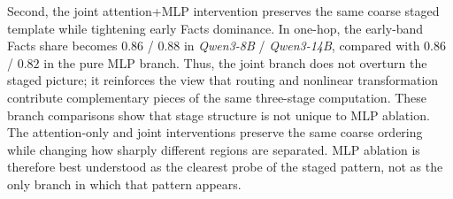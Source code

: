 \documentclass[11pt]{article}
\begin{document}
Second, the joint attention+MLP intervention preserves the same coarse staged template while tightening early Facts dominance. In one-hop, the early-band Facts share becomes $0.86$ / $0.88$ in \textit{Qwen3-8B} / \textit{Qwen3-14B}, compared with $0.86$ / $0.82$ in the pure MLP branch. Thus, the joint branch does not overturn the staged picture; it reinforces the view that routing and nonlinear transformation contribute complementary pieces of the same three-stage computation.
These branch comparisons show that stage structure is not unique to MLP ablation. The attention-only and joint interventions preserve the same coarse ordering while changing how sharply different regions are separated. MLP ablation is therefore best understood as the clearest probe of the staged pattern, not as the only branch in which that pattern appears.
\end{document}
